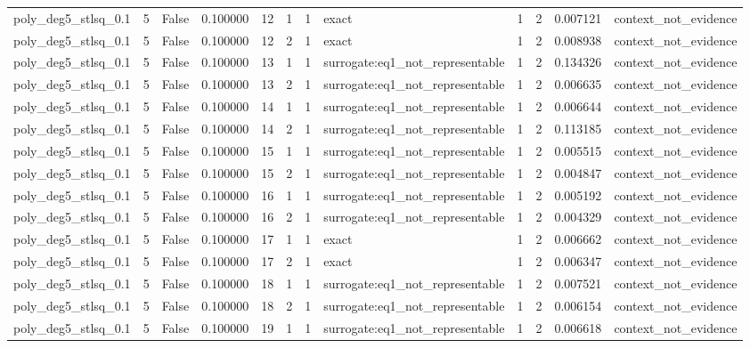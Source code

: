 \begin{tabular}{lrrrrrrlrrrl}
poly\_deg5\_stlsq\_0.1 & 5 & False & 0.100000 & 12 & 1 & 1 & exact & 1 & 2 & 0.007121 & context\_not\_evidence \\
poly\_deg5\_stlsq\_0.1 & 5 & False & 0.100000 & 12 & 2 & 1 & exact & 1 & 2 & 0.008938 & context\_not\_evidence \\
poly\_deg5\_stlsq\_0.1 & 5 & False & 0.100000 & 13 & 1 & 1 & surrogate:eq1\_not\_representable & 1 & 2 & 0.134326 & context\_not\_evidence \\
poly\_deg5\_stlsq\_0.1 & 5 & False & 0.100000 & 13 & 2 & 1 & surrogate:eq1\_not\_representable & 1 & 2 & 0.006635 & context\_not\_evidence \\
poly\_deg5\_stlsq\_0.1 & 5 & False & 0.100000 & 14 & 1 & 1 & surrogate:eq1\_not\_representable & 1 & 2 & 0.006644 & context\_not\_evidence \\
poly\_deg5\_stlsq\_0.1 & 5 & False & 0.100000 & 14 & 2 & 1 & surrogate:eq1\_not\_representable & 1 & 2 & 0.113185 & context\_not\_evidence \\
poly\_deg5\_stlsq\_0.1 & 5 & False & 0.100000 & 15 & 1 & 1 & surrogate:eq1\_not\_representable & 1 & 2 & 0.005515 & context\_not\_evidence \\
poly\_deg5\_stlsq\_0.1 & 5 & False & 0.100000 & 15 & 2 & 1 & surrogate:eq1\_not\_representable & 1 & 2 & 0.004847 & context\_not\_evidence \\
poly\_deg5\_stlsq\_0.1 & 5 & False & 0.100000 & 16 & 1 & 1 & surrogate:eq1\_not\_representable & 1 & 2 & 0.005192 & context\_not\_evidence \\
poly\_deg5\_stlsq\_0.1 & 5 & False & 0.100000 & 16 & 2 & 1 & surrogate:eq1\_not\_representable & 1 & 2 & 0.004329 & context\_not\_evidence \\
poly\_deg5\_stlsq\_0.1 & 5 & False & 0.100000 & 17 & 1 & 1 & exact & 1 & 2 & 0.006662 & context\_not\_evidence \\
poly\_deg5\_stlsq\_0.1 & 5 & False & 0.100000 & 17 & 2 & 1 & exact & 1 & 2 & 0.006347 & context\_not\_evidence \\
poly\_deg5\_stlsq\_0.1 & 5 & False & 0.100000 & 18 & 1 & 1 & surrogate:eq1\_not\_representable & 1 & 2 & 0.007521 & context\_not\_evidence \\
poly\_deg5\_stlsq\_0.1 & 5 & False & 0.100000 & 18 & 2 & 1 & surrogate:eq1\_not\_representable & 1 & 2 & 0.006154 & context\_not\_evidence \\
poly\_deg5\_stlsq\_0.1 & 5 & False & 0.100000 & 19 & 1 & 1 & surrogate:eq1\_not\_representable & 1 & 2 & 0.006618 & context\_not\_evidence \\

\end{tabular}
